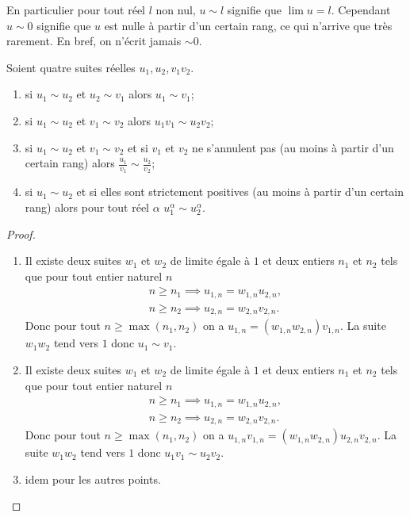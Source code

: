 En particulier pour tout réel \(l\) non nul, \(u \sim l\) signifie que \(\lim u =l\). Cependant \(u \sim 0\) signifie que \(u\) est nulle à partir d'un certain rang, ce qui n'arrive que très rarement. En bref, on n'écrit jamais \(\sim 0\).
\begin{prop}
  Soient quatre suites réelles \(u_1, u_2, v_1 v_2\).
  \begin{enumerate}
  \item si \(u_1 \sim u_2\) et \(u_2 \sim v_1\) alors \(u_1 \sim v_1\);  
  \item si \(u_1 \sim u_2\) et \(v_1 \sim v_2\) alors \(u_1 v_1 \sim u_2 v_2\);
  \item si \(u_1 \sim u_2\) et \(v_1 \sim v_2\) et si \(v_1\) et \(v_2\) ne s'annulent pas (au moins à partir d'un certain rang) alors \(\frac{u_1}{v_1} \sim \frac{u_2}{v_2}\);
  \item si \(u_1 \sim u_2\) et si elles sont strictement positives (au moins à partir d'un certain rang) alors pour tout réel \(\alpha\) \(u_1^\alpha \sim u_2^\alpha\).
  \end{enumerate}
\end{prop}
\begin{proof}
  \begin{enumerate}
  \item Il existe deux suites \(w_1\) et \(w_2\) de limite égale à \(1\) et deux entiers \(n_1\) et \(n_2\) tels que pour tout entier naturel \(n\)
    \begin{align}
      n \geqslant n_1 \implies u_{1,n} = w_{1,n} u_{2,n}, \\
      n \geqslant n_2 \implies u_{2,n} = w_{2,n} v_{2,n}.
    \end{align}
    Donc pour tout \(n \geqslant \max(n_1,n_2)\) on a \(u_{1,n}=(w_{1,n}w_{2,n}) v_{1,n}\). La suite \(w_1 w_2\) tend vers \(1\) donc \(u_1 \sim v_1\).
  \item Il existe deux suites \(w_1\) et \(w_2\) de limite égale à \(1\) et deux entiers \(n_1\) et \(n_2\) tels que pour tout entier naturel \(n\)
  \begin{align}
    n \geqslant n_1 \implies u_{1,n} = w_{1,n} u_{2,n}, \\
    n \geqslant n_2 \implies u_{2,n} = w_{2,n} v_{2,n}.
  \end{align}
  Donc pour tout \(n \geqslant \max(n_1,n_2)\) on a \(u_{1,n}v_{1,n}=(w_{1,n}w_{2,n}) u_{2,n}v_{2,n}\). La suite \(w_1 w_2\) tend vers \(1\) donc \(u_1 v_1\sim u_2 v_2\).
\item idem pour les autres points.
\end{enumerate}
\end{proof}

